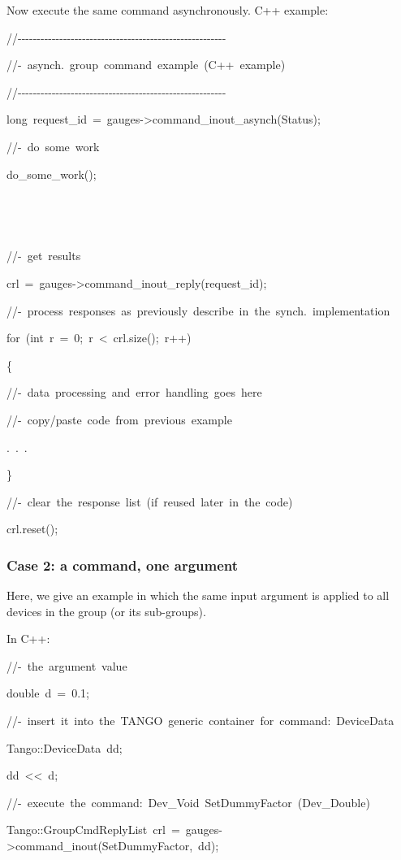 Now execute the same command asynchronously. C++ example:


\begin{lyxcode}
//-{}-{}-{}-{}-{}-{}-{}-{}-{}-{}-{}-{}-{}-{}-{}-{}-{}-{}-{}-{}-{}-{}-{}-{}-{}-{}-{}-{}-{}-{}-{}-{}-{}-{}-{}-{}-{}-{}-{}-{}-{}-{}-{}-{}-{}-{}-{}-{}-{}-{}-{}-{}-{}-{}-

//-~asynch.~group~command~example~(C++~example)

//-{}-{}-{}-{}-{}-{}-{}-{}-{}-{}-{}-{}-{}-{}-{}-{}-{}-{}-{}-{}-{}-{}-{}-{}-{}-{}-{}-{}-{}-{}-{}-{}-{}-{}-{}-{}-{}-{}-{}-{}-{}-{}-{}-{}-{}-{}-{}-{}-{}-{}-{}-{}-{}-{}-

long~request\_id~=~gauges->command\_inout\_asynch(\textquotedbl{}Status\textquotedbl{});

//-~do~some~work

do\_some\_work();

~

~

//-~get~results

crl~=~gauges->command\_inout\_reply(request\_id);

//-~process~responses~as~previously~describe~in~the~synch.~implementation

for~(int~r~=~0;~r~<~crl.size();~r++)

\{

//-~data~processing~and~error~handling~goes~here

//-~copy/paste~code~from~previous~example

.~.~.

\}

//-~clear~the~response~list~(if~reused~later~in~the~code)

crl.reset();
\end{lyxcode}


\subsubsection{Case 2: a command, one argument\label{subsec:Case-2} }

Here, we give an example in which the same input argument is applied
to all devices in the group (or its sub-groups). 

In C++:


\begin{lyxcode}
//-~the~argument~value

double~d~=~0.1;

//-~insert~it~into~the~TANGO~generic~container~for~command:~DeviceData

Tango::DeviceData~dd;

dd~<\textcompwordmark{}<~d;

//-~execute~the~command:~Dev\_Void~SetDummyFactor~(Dev\_Double)

Tango::GroupCmdReplyList~crl~=~gauges->command\_inout(\textquotedbl{}SetDummyFactor\textquotedbl{},~dd);
\end{lyxcode}


